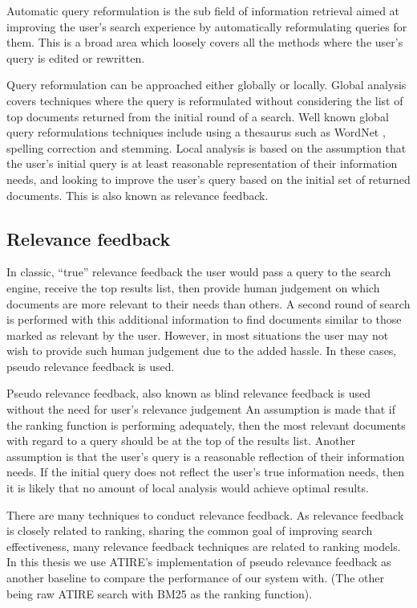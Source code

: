 Automatic query reformulation is the sub field of information retrieval aimed at improving the user’s search experience by automatically reformulating queries for them. This is a broad area which loosely covers all the methods where the user’s query is edited or rewritten. 

Query reformulation can be approached either globally or locally. Global analysis covers techniques where the query is reformulated without considering the list of top documents returned from the initial round of a search. Well known global query reformulations techniques include using a thesaurus such as WordNet \cite{miller1995wordnet}, spelling correction and stemming. Local analysis is based on the assumption that the user’s initial query is at least reasonable representation of their information needs, and looking to improve the user’s query based on the initial set of returned documents. This is also known as relevance feedback. 

\subsection{Relevance feedback}

In classic, “true” relevance feedback the user would pass a query to the search engine,  receive the top results list, then provide human judgement on which documents are more relevant to their needs than others. A second round of search is performed with this additional information to find documents similar to those marked as relevant by the user. However, in most situations the user may not wish to provide such human judgement due to the added hassle. In these cases, pseudo relevance feedback is used. 

Pseudo relevance feedback, also known as blind relevance feedback is used without the need for user's relevance judgement  An assumption is made that if the ranking function is performing adequately, then the most relevant documents with regard to a query should be at the top of the results list. Another assumption is that the user’s query is a reasonable reflection of their information needs. If the initial query does not reflect the user’s true information needs, then it is likely that no amount of local analysis would achieve optimal results. 

There are many techniques to conduct relevance feedback. As relevance feedback is closely related to ranking, sharing the common goal of improving search effectiveness, many relevance feedback techniques are related to ranking models.  In this thesis we use ATIRE's implementation of pseudo relevance feedback as another baseline to compare the performance of our system with. (The other being raw ATIRE search with BM25 as the ranking function). 


